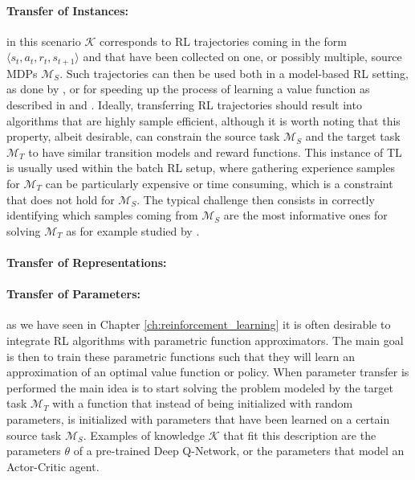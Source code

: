 \paragraph{Transfer of Instances:} in this scenario $\mathcal{K}$ corresponds to RL trajectories coming in the form $\langle s_t, a_t, r_t, s_{t+1}\rangle$ and that have been collected on one, or possibly multiple, source MDPs $\mathcal{M}_S$. Such trajectories can then be used both in a model-based RL setting, as done by \citet{taylor2008transferring}, or for speeding up the process of learning a value function as described in \cite{lazaric2008transfer} and \cite{laroche2017transfer}. Ideally, transferring RL trajectories should result into algorithms that are highly sample efficient, although it is worth noting that this property, albeit desirable, can constrain the source task $\mathcal{M}_S$ and the target task $\mathcal{M}_T$ to have similar transition models and reward functions. This instance of TL is usually used within the batch RL setup, where gathering experience samples for $\mathcal{M}_T$ can be particularly expensive or time consuming, which is a constraint that does not hold for $\mathcal{M}_S$. The typical challenge then consists in correctly identifying which samples coming from $\mathcal{M}_S$ are the most informative ones for solving $\mathcal{M}_T$ as for example studied by \citet{tirinzoni2018importance}.

\paragraph{Transfer of Representations:}
\paragraph{Transfer of Parameters:} as we have seen in Chapter \ref{ch:reinforcement_learning} it is often desirable to integrate RL algorithms with parametric function approximators. The main goal is then to train these parametric functions such that they will learn an approximation of an optimal value function or policy. When parameter transfer is performed the main idea is to start solving the problem modeled by the target task $\mathcal{M}_T$ with a function that instead of being initialized with random parameters, is initialized with parameters that have been learned on a certain source task $\mathcal{M}_S$. Examples of knowledge $\mathcal{K}$ that fit this description are the parameters $\theta$ of a pre-trained Deep Q-Network, or the parameters that model an Actor-Critic agent.  

